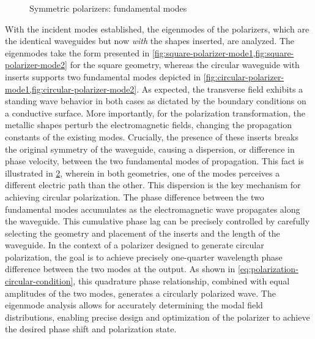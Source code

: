\documentclass[14pt,a4paper]{ntust_report}
\begin{document}
\begin{figure}
\begin{subfigure}{.45\textwidth}
        \caption{\label{fig:circular-polarizer-mode2}}
    \end{subfigure}
    \caption{\label{fig:symmetric-polarizer-modes}Symmetric polarizers: fundamental modes}
\end{figure}

With the incident modes established, the eigenmodes of the polarizers, which are the identical waveguides but now \emph{with} the shapes inserted, are analyzed. The eigenmodes take the form presented in \cref{fig:square-polarizer-mode1,fig:square-polarizer-mode2} for the square geometry, whereas the circular waveguide with inserts supports two fundamental modes depicted in \cref{fig:circular-polarizer-mode1,fig:circular-polarizer-mode2}. As expected, the transverse field exhibits a standing wave behavior in both cases as dictated by the boundary conditions on a conductive surface. More importantly, for the polarization transformation, the metallic shapes perturb the electromagnetic fields, changing the propagation constants of the existing modes. Crucially, the presence of these inserts breaks the original symmetry of the waveguide, causing a dispersion, or difference in phase velocity, between the two fundamental modes of propagation. This fact is illustrated in \cref{fig:symmetric-polarizer-modes}, wherein in both geometries, one of the modes perceives a different electric path than the other. This dispersion is the key mechanism for achieving circular polarization. The phase difference between the two fundamental modes accumulates as the electromagnetic wave propagates along the waveguide. This cumulative phase lag can be precisely controlled by carefully selecting the geometry and placement of the inserts and the length of the waveguide. In the context of a polarizer designed to generate circular polarization, the goal is to achieve precisely one-quarter wavelength phase difference between the two modes at the output. As shown in \cref{eq:polarization-circular-condition}, this quadrature phase relationship, combined with equal amplitudes of the two modes, generates a circularly polarized wave. The eigenmode analysis allows for accurately determining the modal field distributions, enabling precise design and optimization of the polarizer to achieve the desired phase shift and polarization state.
\end{document}
